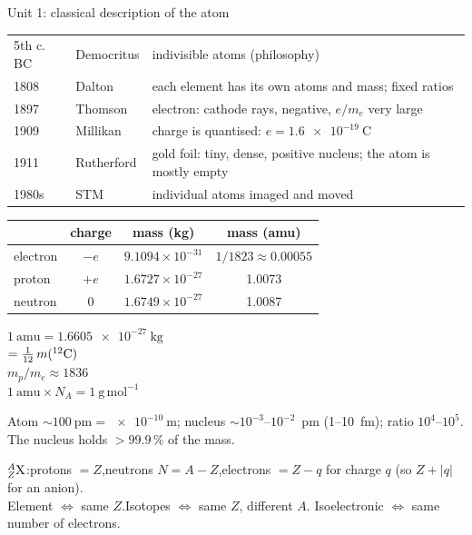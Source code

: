 \clearpage
\begin{recap}{Unit 1: classical description of the atom}
\begin{tabular}{@{}l l l@{}}
5th c. BC & Democritus & indivisible atoms (philosophy)\\
1808 & Dalton & each element has its own atoms and mass; fixed ratios\\
1897 & Thomson & electron: cathode rays, negative, $e/m_e$ very large\\
1909 & Millikan & charge is quantised: $e = \SI{1.6e-19}{\coulomb}$\\
1911 & Rutherford & gold foil: tiny, dense, positive nucleus; the atom is mostly empty\\
1980s & STM & individual atoms imaged and moved
\end{tabular}

\begin{tabular}{@{}l c c c@{}}
\toprule
 & charge & mass (kg) & mass (amu)\\ \midrule
electron & $-e$ & $9.1094\times10^{-31}$ & $1/1823 \approx 0.00055$\\
proton & $+e$ & $1.6727\times10^{-27}$ & 1.0073\\
neutron & 0 & $1.6749\times10^{-27}$ & 1.0087\\ \bottomrule
\end{tabular}\hfill
\begin{minipage}[t]{40mm}\small
$1\ \mathrm{amu} = \SI{1.6605e-27}{\kilo\gram}$\\ $= \frac1{12}\,m({}^{12}\mathrm{C})$\\[2pt]
$m_p/m_e \approx 1836$\\[2pt]
$1\ \mathrm{amu}\times N_A = 1\ \mathrm{g\,mol^{-1}}$
\end{minipage}

Atom $\sim\SI{100}{\pico\metre} = \SI{e-10}{\metre}$; nucleus $\sim 10^{-3}$--$10^{-2}$~pm (1--10~fm);
ratio $10^4$--$10^5$. The nucleus holds $>99.9\,\%$ of the mass.

${}^{A}_{Z}\mathrm{X}$:\quad protons $=Z$,\quad neutrons $N = A-Z$,\quad electrons $= Z - q$ for charge $q$
(so $Z+|q|$ for an anion).\\
Element $\Leftrightarrow$ same $Z$.\quad Isotopes $\Leftrightarrow$ same $Z$, different $A$.\quad
Isoelectronic $\Leftrightarrow$ same number of electrons.


\end{recap}
